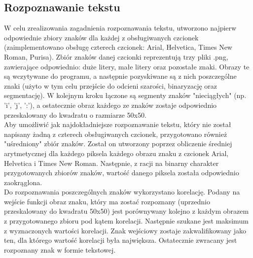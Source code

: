 \subsection{Rozpoznawanie tekstu}

W celu zrealizowania zagadnienia rozpoznawania tekstu, utworzono najpierw odpowiednie zbiory znaków dla każdej z obsługiwanych czcionek (zaimplementowano obsługę czterech czcionek: Arial, Helvetica, Times New Roman, Purisa). Zbiór znaków danej czcionki reprezentują trzy pliki .png, zawierające odpowiednio: duże litery, małe litery oraz pozostałe znaki. Obrazy te są wczytywane do programu, a następnie pozyskiwane są z nich poszczególne znaki (użyto w tym celu przejście do odcieni szarości, binaryzację oraz segmentację). W kolejnym kroku łączone są segmenty znaków "nieciągłych" (np. 'i', 'j', ':'), a ostatecznie obraz każdego ze znaków zostaje odpowiednio przeskalowany do kwadratu o razmiarze 50x50.\\

Aby umożliwić jak najdokładniejsze rozpoznawanie tekstu, który nie został napisany żadną z czterech obsługiwanych czcionek, przygotowano również "uśredniony" zbiór znaków. Został on utworzony poprzez obliczenie średniej arytmetycznej dla każdego piksela każdego obrazu znaku z czcionek Arial, Helvetica i Times New Roman. Następnie, z racji na binarny charakter przygotowanych zbiorów znaków, wartość danego piksela została odpowiednio zaokrąglona.\\

Do rozpoznawania poszczególnych znaków wykorzystano korelację. Podany na wejście funkcji obraz znaku, który ma zostać rozpoznany (uprzednio przeskalowany do kwadratu 50x50) jest porównywany kolejno z każdym obrazem z przygotowanego zbioru pod kątem korelacji. Następnie szukane jest maksimum z wyznaczonych wartości korelacji. Znak wejściowy zostaje zakwalifikowany jako ten, dla którego wartość korelacji była największa. Ostatecznie zwracany jest rozpoznany znak w formie tekstowej.
